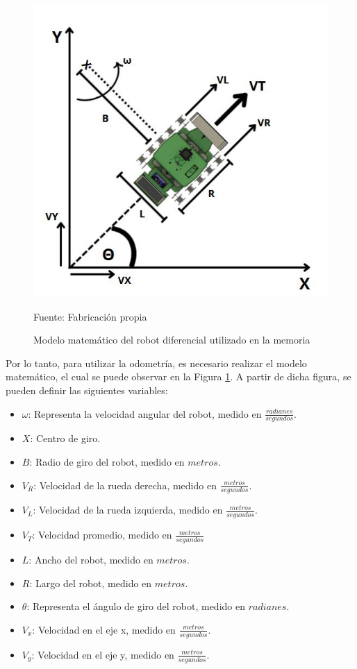 \begin{figure}[H]
\centering
\includegraphics[width=15cm]{figures/04diseño_experimental/odometría.JPG}
\caption{Modelo matemático del robot diferencial utilizado en la memoria}
Fuente: Fabricación propia
\label{fig:robocop_odometría}
\end{figure}
Por lo tanto, para utilizar la odometría, es necesario realizar el modelo matemático, el cual se puede observar en la Figura \ref{fig:robocop_odometría}. A partir de dicha figura, se pueden definir las siguientes variables:
\begin{itemize}
    \item \textbf{$\omega$}: Representa la velocidad angular del robot, medido en $\frac{radianes}{segundos}$.
    \item \textbf{$X$}: Centro de giro.
    \item \textbf{$B$}: Radio de giro del robot, medido en $metros$.
    \item \textbf{$V_{R}$}: Velocidad de la rueda derecha, medido en $\frac{metros}{segundos}$.
    \item \textbf{$V_{L}$}: Velocidad de la rueda izquierda, medido en $\frac{metros}{segundos}$.
    \item \textbf{$V_{T}$}: Velocidad promedio, medido en $\frac{metros}{segundos}$
    \item \textbf{$L$}: Ancho del robot, medido en $metros$.
    \item \textbf{$R$}: Largo del robot, medido en $metros$.
    \item \textbf{$\theta$}: Representa el ángulo de giro del robot, medido en $radianes$.
    \item \textbf{$V_x$}: Velocidad en el eje x, medido en $\frac{metros}{segundos}$.
    \item \textbf{$V_y$}: Velocidad en el eje y, medido en $\frac{metros}{segundos}$.
\end{itemize}

